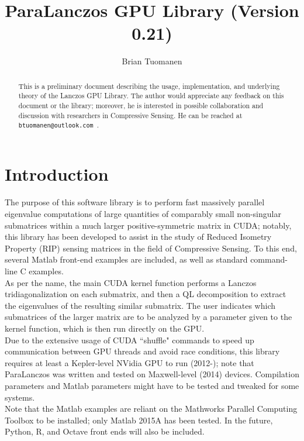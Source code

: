 \documentclass{amsart}
\title{ParaLanczos GPU Library (Version 0.21)}
\author[Tuomanen]{Brian Tuomanen}
\begin{document}
\maketitle

\begin{abstract}
This is a preliminary document describing the usage, implementation, and underlying theory of the  Lanczos GPU Library.  The author would appreciate any feedback on this document or the library;  moreover, he is interested in possible collaboration and discussion with researchers in Compressive Sensing.  He can be reached at {\tt btuomanen@outlook.com }.
\end{abstract}


\section{Introduction}



The purpose of this software library is to perform fast massively parallel eigenvalue computations of large quantities of comparably small non-singular submatrices within a much larger positive-symmetric matrix in CUDA;  notably, this library has been developed to assist in the study of Reduced Isometry Property (RIP) sensing matrices in the field of Compressive Sensing.  To this end, several Matlab front-end examples are included, as well as standard command-line C examples.\\

As per the name, the main CUDA kernel function performs a Lanczos tridiagonalization on each submatrix, and then a QL decomposition to extract the eigenvalues of the resulting similar submatrix.  The user indicates which submatrices of the larger matrix are to be analyzed by a parameter given to the kernel function, which is then run directly on the GPU.\\ 

Due to the extensive usage of CUDA ``shuffle" commands to speed up communication between GPU threads and avoid race conditions, this library requires at least a Kepler-level NVidia GPU to run (2012-);  note that ParaLanczos was written and tested on Maxwell-level (2014) devices.  Compilation  parameters and Matlab parameters might have to be tested and tweaked for some systems.\\

Note that the Matlab examples are reliant on the Mathworks Parallel Computing Toolbox to be installed;  only Matlab 2015A has been tested.  In the future, Python, R, and Octave front ends will also be included.\\ 
\end{document}
